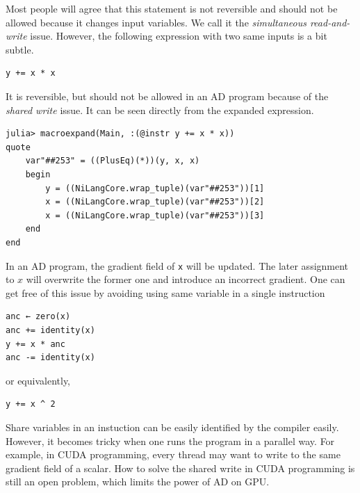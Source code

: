 \documentclass{article}
\newcommand{\<}{\langle}
\renewcommand{\>}{\rangle}
\theoremstyle{definition}\newtheorem{definition}{\textit{Definition}}
\begin{document}
Most people will agree that this statement is not reversible and should not be allowed because it changes input variables.
We call it the \textit{simultaneous read-and-write} issue.
However, the following expression with two same inputs is a bit subtle.

\begin{minipage}{.88\columnwidth}
\begin{lstlisting}
y += x * x
\end{lstlisting}
\end{minipage}

It is reversible, but should not be allowed in an AD program because of the \textit{shared write} issue.
It can be seen directly from the expanded expression.

\begin{minipage}{.88\columnwidth}
\begin{lstlisting}
julia> macroexpand(Main, :(@instr y += x * x))
quote
    var"##253" = ((PlusEq)(*))(y, x, x)
    begin
        y = ((NiLangCore.wrap_tuple)(var"##253"))[1]
        x = ((NiLangCore.wrap_tuple)(var"##253"))[2]
        x = ((NiLangCore.wrap_tuple)(var"##253"))[3]
    end
end
\end{lstlisting}
\end{minipage}

In an AD program, the gradient field of \texttt{x} will be updated.
The later assignment to $x$ will overwrite the former one and introduce an incorrect gradient.
One can get free of this issue by avoiding using same variable in a single instruction

\begin{minipage}{.88\columnwidth}
\begin{lstlisting}
anc ← zero(x)
anc += identity(x)
y += x * anc
anc -= identity(x)
\end{lstlisting}
\end{minipage}

or equivalently,

\begin{minipage}{.88\columnwidth}
\begin{lstlisting}
y += x ^ 2
\end{lstlisting}
\end{minipage}

Share variables in an instuction can be easily identified by the compiler easily.
However, it becomes tricky when one runs the program in a parallel way.
For example, in CUDA programming, every thread may want to write to the same gradient field of a scalar.
How to solve the shared write in CUDA programming is still an open problem, which limits the power of AD on GPU.
\end{document}
